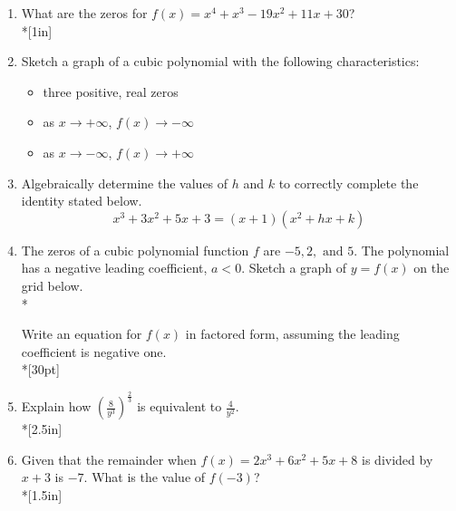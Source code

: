 \documentclass[12pt, oneside]{article}
\begin{document}
\begin{enumerate}
\item What are the zeros for $f(x)=x^4+x^3-19x^2+11x+30$? \\*[1in]  

\newpage

\item Sketch a graph of a cubic polynomial with the following characteristics: 
\begin{itemize}
\item three positive, real zeros
\item as $x \rightarrow + \infty$, $f(x) \rightarrow - \infty$
\item as $x \rightarrow - \infty$, $f(x) \rightarrow + \infty$
\end{itemize}
\begin{center}
\end{center} %


\item Algebraically determine the values of $h$ and $k$ to correctly complete the identity stated below.
\[x^3+3x^2+5x+3=(x+1)(x^2+hx+k)\] %

\newpage
\item The zeros of a cubic polynomial function $f$ are  $-5, 2, \text{ and } 5$. The polynomial has a negative leading coefficient, $a<0$. Sketch a graph of $y = f(x)$ on the grid below.\\*
\begin{center}
\end{center}
Write an equation for $f(x)$ in factored form, assuming the leading coefficient is negative one.\\*[30pt]

\newpage

\item Explain how $\displaystyle \left( \frac{8}{y^3} \right)^\frac{2}{3}$ is equivalent to $\displaystyle \frac{4}{y^2}$. \\*[2.5in]


\item Given that the remainder when  $f(x)=2x^3+6x^2+5x+8$ is divided by $x+3$ is $-7$. What is the value of $f(-3)$? \\*[1.5in]


\end{enumerate}
\end{document}
